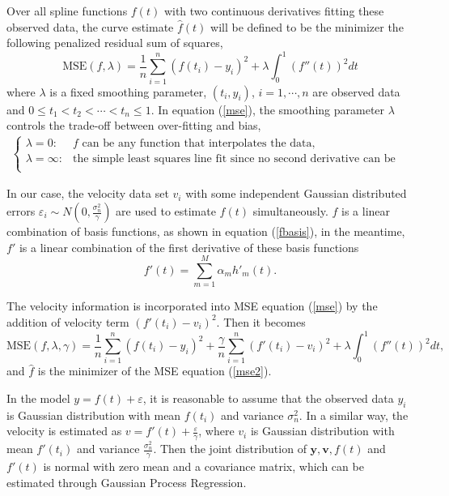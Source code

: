 Over all spline functions $f(t)$ with two continuous derivatives fitting these observed data, the curve estimate  $\hat{f}(t)$ will be defined to be the minimizer the following penalized residual sum of squares, 
\begin{equation}\label{mse}
\text{MSE}(f,\lambda)=\frac{1}{n}\sum_{i=1}^n(f(t_i)-y_i)^2+\lambda \int_{0}^{1}(f''(t))^2dt
\end{equation}
where $\lambda$ is a fixed smoothing parameter, $(t_i,y_i)$, $i=1, \cdots, n$ are observed data and $0 \leq t_1< t_2 < \cdots <t_n \leq 1$. In equation (\ref{mse}),  the smoothing parameter $\lambda$ controls the trade-off between over-fitting and bias,
\begin{align}
\begin{cases}
\lambda = 0 : & \mbox{$f$ can be any function that interpolates the data,}\\
\lambda = \infty: & \mbox{the simple least squares line fit since no second derivative can be tolerated.}\\
\end{cases}
\end{align}

In our case, the velocity data set $v_i$ with some independent Gaussian distributed errors $\varepsilon_i \sim N(0, \frac{\sigma_n^2}{\gamma})$ are used to estimate $f(t)$ simultaneously. $f$ is a linear combination of basis functions, as shown in equation (\ref{fbasis}), in the meantime, $f'$ is a linear combination of the first derivative of these basis functions
\begin{equation}
f'(t) =\sum_{m=1}^{M}\alpha_mh'_m(t).
\end{equation}

The velocity information  is incorporated into MSE  equation (\ref{mse}) by the addition of velocity term $(f'(t_i)-v_i)^2$. Then it becomes 
\begin{equation}\label{mse2}
\text{MSE}(f,\lambda,\gamma)=\frac{1}{n}\sum_{i=1}^n(f(t_i)-y_i)^2+\frac{\gamma}{n} \sum_{i=1}^n(f'(t_i)-v_i)^2+\lambda \int_{0}^{1}(f''(t))^2dt,
\end{equation}
and $\hat{f}$ is the minimizer of the MSE equation (\ref{mse2}).

In the model $y=f(t)+\varepsilon$, it is reasonable to assume that the observed data $y_i$ is Gaussian distribution with mean $f(t_i)$ and variance $\sigma_n^2$. In a similar way, the velocity is estimated as  $v=f'(t)+\frac{\varepsilon}{\gamma}$, where $v_i$ is Gaussian distribution with mean $f'(t_i)$ and variance $\frac{\sigma_n^2}{\gamma}$. Then the joint distribution of $\mathbf{y},\mathbf{v},f(t)$ and $f'(t)$ is normal with zero mean and a covariance matrix, which can be estimated through Gaussian Process Regression.


